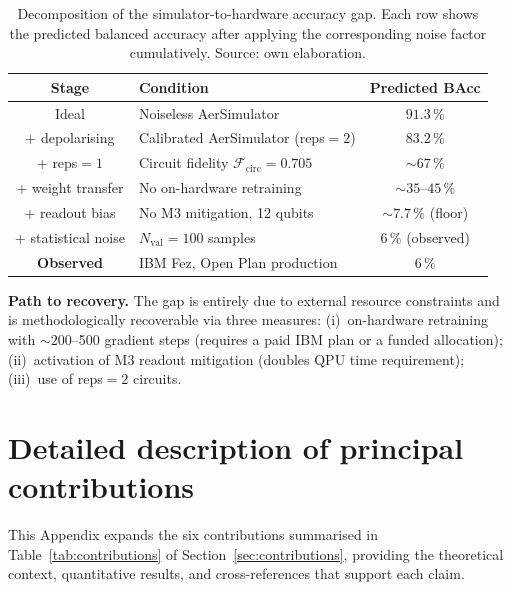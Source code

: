 \documentclass[11pt,a4paper, english]{book}
\theoremstyle{plain}
\theoremstyle{definition}
\numberwithin{equation}{chapter}
\numberwithin{figure}{chapter}
\numberwithin{table}{chapter}
\begin{document}
\begin{table}[ht]
\centering
\begin{tabular}{@{}clc@{}}
\toprule
\textbf{Stage} & \textbf{Condition} & \textbf{Predicted BAcc} \\
\midrule
Ideal & Noiseless AerSimulator & $91.3\,\%$ \\
+ depolarising & Calibrated AerSimulator (reps$=2$) & $83.2\,\%$ \\
+ reps$=1$ & Circuit fidelity $\mathcal{F}_\mathrm{circ}=0.705$ & ${\sim}67\,\%$ \\
+ weight transfer & No on-hardware retraining & ${\sim}35\text{--}45\,\%$ \\
+ readout bias & No M3 mitigation, 12 qubits & ${\sim}7.7\,\%$ (floor) \\
+ statistical noise & $N_\mathrm{val}=100$ samples & $6\,\%$ (observed) \\
\midrule
\textbf{Observed} & IBM Fez, Open Plan production & $6\,\%$ \\
\bottomrule
\end{tabular}
\caption[Simulator-to-hardware accuracy gap: factor decomposition]{
  Decomposition of the simulator-to-hardware accuracy gap.
  Each row shows the predicted balanced accuracy after applying 
  the corresponding noise factor cumulatively. Source: own elaboration.}
\label{tab:gap-summary}


\end{table}

\noindent\textbf{Path to recovery.}
The gap is entirely due to external resource constraints and is 
methodologically recoverable via three measures:
(i)~on-hardware retraining with ${\sim}200$--500 gradient steps 
(requires a paid IBM plan or a funded allocation);
(ii)~activation of M3 readout mitigation (doubles QPU time requirement);
(iii)~use of reps$=2$ circuits.


\chapter{Detailed description of principal contributions}
\label{app:contributions-detail}

This Appendix expands the six contributions summarised in
Table~\ref{tab:contributions} of Section~\ref{sec:contributions},
providing the theoretical context, quantitative results, and
cross-references that support each claim.
\end{document}

